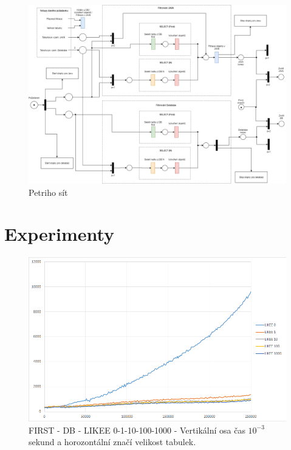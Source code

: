 \documentclass[a4paper, 11pt]{article}
\begin{document}
\begin{figure}[H]
\centering
\includegraphics[width=220mm,  angle =90]{images/IMS-projekt.png}
\caption{Petriho sít}
\label{sec:obr7}
\end{figure}

\section{Experimenty}


\begin{figure}[H]
\centering
\includegraphics[width=150mm, frame]{images/FIRST-DB.png}
\caption{FIRST - DB - LIKEE 0-1-10-100-1000 - Vertikální osa čas $10^{-3}$ sekund a horozontální značí velikost tabulek.}
\label{sec:obr5}
\end{figure}
\end{document}
